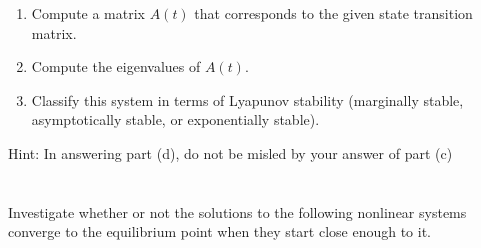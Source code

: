 \documentclass[10pt]{article}
\begin{document}
\begin{enumerate}[label=(\alph*)]
\begin{align*}
\begin{bmatrix}
    e^{2t_0}s_0 & e^{2t_0}c_0
  \end{bmatrix},
\end{align*}
where $c_0 = \cos(2t_0)$, and $s_0 = \sin(2t_0)$. Now we can plug back
in to get the full transition matrix
\begin{equation*}
  \begin{split}
    \phi(t,t_0) &= \phi(t,0)\phi^{-1}(t_0, 0)\\
    &=
    \begin{bmatrix}
      e^tc & e^{-2t} s \\ -e^ts & e^{-2t}c
    \end{bmatrix}
    \begin{bmatrix}
      e^{-t_0}c_0 & -e^{-t_0}s_0 \\
      e^{2t_0}s_0 & e^{2t_0}c_0
    \end{bmatrix}\\
    &= 
    \begin{bmatrix}
      e^{t-t_0}cc_0 + e^{-2(t-t_0)}ss_0 & -e^{t-t_0}cs_0 + e
      ^{-2(t-t_0)}s c_0\\
      -e^{t-t_0}sc_0 +e^{-2(t-t_0)}cs_0 & e^{t-t_0}ss_0 +
      e^{-2(t-t_0)}cc_0 
    \end{bmatrix}\\
    &= 
    \begin{bmatrix}
      e^{t-t_0}\cos(2t)\cos(2t_0) + e^{-2(t-t_0)}\sin(2t)\sin(2t_0) 
      & -e^{t-t_0}\cos(2t)\sin(2t_0) + e^{-2(t-t_0)}\sin(2t) \cos(2t_0)\\
      -e^{t-t_0}\sin(2t)\cos(2t_0) +e^{-2(t-t_0)}\cos(2t)\sin(2t_0) 
      & e^{t-t_0}\sin(2t)\sin(2t_0) +e^{-2(t-t_0)}\cos(2t)\cos(2t_0) 
    \end{bmatrix}
  \end{split}
\end{equation*}
\item Compute a matrix $A(t)$ that corresponds to the given state
  transition matrix.
\item Compute the eigenvalues of $A(t)$.
\item Classify this system in terms of Lyapunov stability (marginally
  stable, asymptotically stable, or exponentially stable).
\end{enumerate}

Hint: In answering part (d), do not be misled by your answer of part
(c)


\section{}
Investigate whether or not the solutions to the following nonlinear
systems converge to the equilibrium point when they start close enough
to it.
\end{document}
